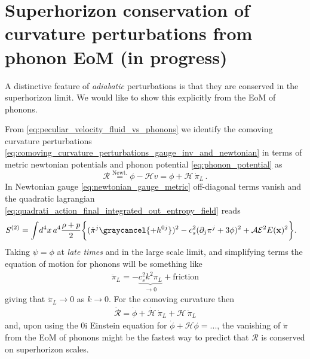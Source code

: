\section{Superhorizon conservation of curvature perturbations from phonon EoM {\color{red}(in progress)}}
A distinctive feature of \emph{adiabatic} perturbations is that they are conserved in the superhorizon limit.
We would like to show this explicitly from the EoM of phonons.

From \eqref{eq:peculiar_velocity_fluid_vs_phonons} we identify the comoving curvature perturbations \eqref{eq:comoving_curvature_perturbations_gauge_inv_and_newtonian} in terms of metric newtonian potentials and phonon potential \eqref{eq:phonon_potential} as
\begin{equation}
    \mathcal{R} \overset{\text{Newt.}}{=} \phi -\mathcal{H}v = \phi + \mathcal{H}\,\dot{\pi}_L\,.
\end{equation}
%
In Newtonian gauge \eqref{eq:newtonian_gauge_metric} off-diagonal terms vanish and the quadratic lagrangian \eqref{eq:quadrati_action_final_integrated_out_entropy_field} reads 
{\small
\begin{align}
\begin{aligned}
   S^{(2)}&=\int\! d^4x\, a^4\frac{\rho+p}{2}\bigg\{
    (\dot{\pi}^j\graycancel{+h^{0j}})^2 -c_s^2(\partial_j \pi^j+3\phi)^2  + \mathcal{A}\mathcal{E}^2 E(\mathbf{x})^2\bigg\}.
\end{aligned}
\end{align}}
Taking $\psi=\phi$ at \emph{late times} and in the large scale limit, and simplifying terms the equation of motion for phonons will be something like
\begin{align}
    \ddot{\pi}_L=-\underbrace{c_s^2 k^2\pi_L}_{\to0}+\text{friction}
\end{align}
giving that $\ddot{\pi}_L\to 0$ as $k\to0$.
For the comoving curvature then
\begin{align}
    \dot{\mathcal{R}}=\dot{\phi}+\dot{\mathcal{H}}\,\dot{\pi}_L+\mathcal{H}\,\ddot{\pi}_L
\end{align}
and, upon using the 0i Einstein equation for $\dot{\phi}+\mathcal{H}\phi=...$, the vanishing of $\ddot{\pi}$ from the EoM of phonons might be the fastest way to predict that $\mathcal{R}$ is conserved on superhorizon scales.
